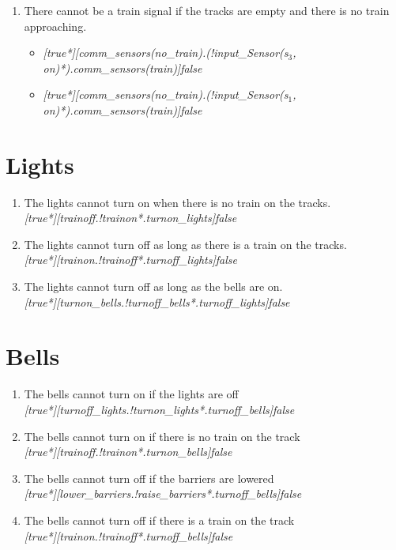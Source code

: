 \documentclass[final]{report}
\begin{document}
\begin{enumerate}
\item There cannot be a train signal if the tracks are empty and there is no train approaching.
\begin{itemize}
\item \textit{[true*][comm\_sensors(no\_train).(!input\_Sensor(s$_{3}$, on)*).comm\_sensors(train)]false}
\item \textit{[true*][comm\_sensors(no\_train).(!input\_Sensor(s$_{1}$, on)*).comm\_sensors(train)]false}
\end{itemize}

\end{enumerate}
\section{Lights}

\begin{enumerate}
\item The lights cannot turn on when there is no train on the tracks.\\
\textit{[true*][trainoff.!trainon*.turnon\_lights]false}

\item The lights cannot turn off as long as there is a train on the tracks.\\
\textit{[true*][trainon.!trainoff*.turnoff\_lights]false}

\item The lights cannot turn off as long as the bells are on.\\
\textit{[true*][turnon\_bells.!turnoff\_bells*.turnoff\_lights]false}
\end{enumerate}

\section{Bells}
\begin{enumerate}
\item The bells cannot turn on if the lights are off\\
\textit{[true*][turnoff\_lights.!turnon\_lights*.turnoff\_bells]false}
\item The bells cannot turn on if there is no train on the track\\
\textit{[true*][trainoff.!trainon*.turnon\_bells]false}
\item The bells cannot turn off if the barriers are lowered\\
\textit{[true*][lower\_barriers.!raise\_barriers*.turnoff\_bells]false}
\item The bells cannot turn off if there is a train on the track\\
\textit{[true*][trainon.!trainoff*.turnoff\_bells]false}
\end{enumerate}
\end{document}
